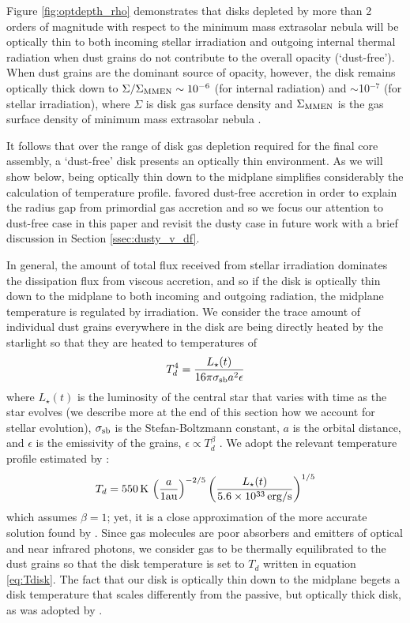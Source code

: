 \documentclass[twocolumn]{aastex631}
\begin{document}
Figure \ref{fig:optdepth_rho} demonstrates that disks depleted by more than 2 orders of magnitude with respect to the minimum mass extrasolar nebula will be optically thin to both incoming stellar irradiation and outgoing internal thermal radiation when dust grains do not contribute to the overall opacity (`dust-free'). When dust grains are the dominant source of opacity, however, the disk remains optically thick down to $\Sigma/\Sigma_{\rm MMEN} \sim 10^{-6}$ (for internal radiation) and $\sim$10$^{-7}$ (for stellar irradiation), where $\Sigma$ is disk gas surface density and $\Sigma_{\rm MMEN}$ is the gas surface density of minimum mass extrasolar nebula \citep{Chiang13}. 

It follows that over the range of disk gas depletion required for the final core assembly, a `dust-free' disk presents an optically thin environment. As we will show below, being optically thin down to the midplane simplifies considerably the calculation of temperature profile. \citet{Lee21} favored dust-free accretion in order to explain the radius gap from primordial gas accretion and so we focus our attention to dust-free case in this paper and revisit the dusty case in future work with a brief discussion in Section \ref{ssec:dusty_v_df}. 

In general, the amount of total flux received from stellar irradiation dominates the dissipation flux from viscous accretion, and so if the disk is optically thin down to the midplane to both incoming and outgoing radiation, the midplane temperature is regulated by irradiation.
We consider the trace amount of individual dust grains everywhere in the disk are being directly heated by the starlight so that they are heated to temperatures of
%
\begin{equation}
    T_d^4 = \frac{L_\star (t)}{16\pi \sigma_{\rm sb} a^2 \epsilon}
\end{equation}
%
where $L_\star (t)$ is the luminosity of the central star that varies with time as the star evolves (we describe more at the end of this section how we account for stellar evolution), $\sigma_{\rm sb}$ is the Stefan-Boltzmann constant, $a$ is the orbital distance, and $\epsilon$ is the emissivity of the grains, $\epsilon \propto T_d^\beta$ \citep[e.g.,][]{Chiang97,Garaud07}. We adopt the relevant temperature profile estimated by \citet{Chiang97}:
%
\begin{equation}
    T_d = 550\,{\rm K}\,\left(\frac{a}{1 {\rm au}}\right)^{-2/5}\left(\frac{L_\star (t)}{5.6\times 10^{33}\,{\rm erg/s}}\right)^{1/5}
    \label{eq:Tdisk}
\end{equation}
%
which assumes $\beta=1$; yet, it is a close approximation of the more accurate solution found by \citet[][see their Figure 5]{Chiang01}. Since gas molecules are poor absorbers and emitters of optical and near infrared photons, we consider gas to be thermally equilibrated to the dust grains so that the disk temperature is set to $T_d$ written in equation \ref{eq:Tdisk}. The fact that our disk is optically thin down to the midplane begets a disk temperature that scales differently from the passive, but optically thick disk, as was adopted by \citet{Lee21}.
\end{document}
